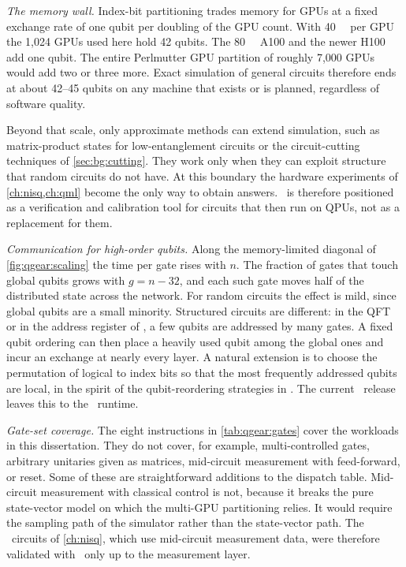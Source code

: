 \emph{The memory wall.} Index-bit partitioning trades memory for GPUs at a fixed exchange rate of one qubit per doubling of the GPU count. With \SI{40}{\giga\byte} per GPU the 1,024 GPUs used here hold 42 qubits. The \SI{80}{\giga\byte} A100 and the newer H100 add one qubit. The entire Perlmutter GPU partition of roughly 7,000 GPUs would add two or three more. Exact simulation of general circuits therefore ends at about 42--45 qubits on any machine that exists or is planned, regardless of software quality.

Beyond that scale, only approximate methods can extend simulation, such as matrix-product states \cite{perezgarcia2006mps} for low-entanglement circuits or the circuit-cutting techniques of \cref{sec:bg:cutting}. They work only when they can exploit structure that random circuits do not have. At this boundary the hardware experiments of \cref{ch:nisq,ch:qml} become the only way to obtain answers. \qgear\ is therefore positioned as a verification and calibration tool for circuits that then run on QPUs, not as a replacement for them.

\emph{Communication for high-order qubits.} Along the memory-limited diagonal of \cref{fig:qgear:scaling} the time per gate rises with $n$. The fraction of gates that touch global qubits grows with $g=n-32$, and each such gate moves half of the distributed state across the network. For random circuits the effect is mild, since global qubits are a small minority. Structured circuits are different: in the QFT or in the address register of \qcrank, a few qubits are addressed by many gates. A fixed qubit ordering can then place a heavily used qubit among the global ones and incur an exchange at nearly every layer. A natural extension is to choose the permutation of logical to index bits so that the most frequently addressed qubits are local, in the spirit of the qubit-reordering strategies in \cite{bayraktar2023cuquantum,doi2023multishotgpu}. The current \qgear\ release leaves this to the \cudaq\ runtime.

\emph{Gate-set coverage.} The eight instructions in \cref{tab:qgear:gates} cover the workloads in this dissertation. They do not cover, for example, multi-controlled gates, arbitrary unitaries given as matrices, mid-circuit measurement with feed-forward, or reset. Some of these are straightforward additions to the dispatch table. Mid-circuit measurement with classical control is not, because it breaks the pure state-vector model on which the multi-GPU partitioning relies. It would require the sampling path of the simulator rather than the state-vector path. The \qawa\ circuits of \cref{ch:nisq}, which use mid-circuit measurement data, were therefore validated with \qgear\ only up to the measurement layer.


